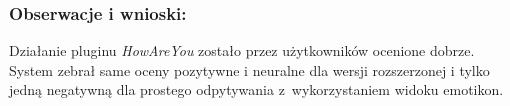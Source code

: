 	\subsubsection{Obserwacje i wnioski:}
	
	Działanie pluginu \textit{HowAreYou} zostało przez użytkowników ocenione dobrze. System zebrał same oceny pozytywne i neuralne dla wersji rozszerzonej i tylko jedną negatywną dla prostego odpytywania z~wykorzystaniem widoku emotikon.
	
	